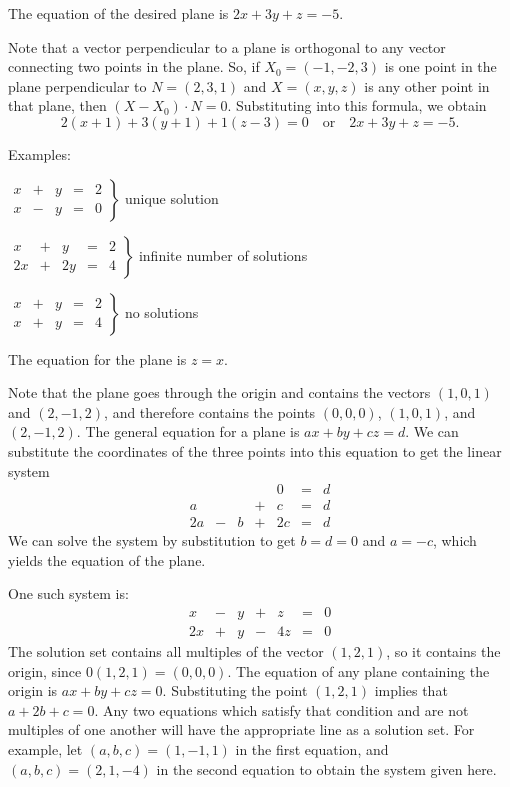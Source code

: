 \ans The equation of the desired plane is $2x + 3y + z = -5$.

\soln Note that a vector perpendicular to a plane is orthogonal
to any vector connecting two points in the plane.  So,
if $X_0 = (-1,-2,3)$ is one point in the plane perpendicular to
$N = (2,3,1)$ and $X = (x,y,z)$ is any other point in that plane,
then $(X - X_0) \cdot N = 0$.  Substituting into this formula, we obtain
\[
2(x + 1) + 3(y + 1) + 1(z - 3) = 0\quad\mbox{or}\quad
2x + 3y + z = -5.
\]

Examples:

$\left. \begin{array}{rrrrr}
x & + & y & = & 2 \\
x & - & y & = & 0\end{array} \right\}$
unique solution

$\left. \begin{array}{rrrrr}
x & + & y & = & 2 \\
2x & + & 2y & = & 4\end{array} \right\}$
infinite number of solutions

$\left. \begin{array}{rrrrr}
x & + & y & = & 2 \\
x & + & y & = & 4\end{array} \right\}$
no solutions

\ans The equation for the plane is $z = x$.

\soln Note that the plane goes through the origin and contains the
vectors $(1,0,1)$ and $(2,-1,2)$, and therefore contains the points
$(0,0,0)$, $(1,0,1)$, and $(2,-1,2)$.  The general equation for a plane
is $ax + by + cz = d$.  We can substitute the coordinates of the three
points into this equation to get the linear system
\[
\begin{array}{rrrrrrr}
 & & & & 0 & = & d \\
a & & & + & c & = & d \\
2a & - & b & + & 2c & = & d\end{array}
\]
We can solve the system by substitution to get $b = d = 0$ and $a = -c$,
which yields the equation of the plane.

\ans One such system is:
\[
\begin{array}{rrrrrrr}
x & - & y & + & z & = & 0 \\
2x & + & y & - & 4z & = & 0\end{array}
\]
\soln The solution set contains all multiples of the vector $(1,2,1)$,
so it contains the origin, since $0(1,2,1) = (0,0,0)$.  The equation
of any plane containing the origin is $ax + by + cz = 0$. 
Substituting the point $(1,2,1)$ implies that $a + 2b + c = 0$. 
Any two equations which satisfy that condition and are not multiples
of one another will have the appropriate line as a solution set. 
For example, let $(a,b,c) = (1,-1,1)$ in the first equation, and
$(a,b,c) = (2,1,-4)$ in the second equation to obtain the system
given here.




